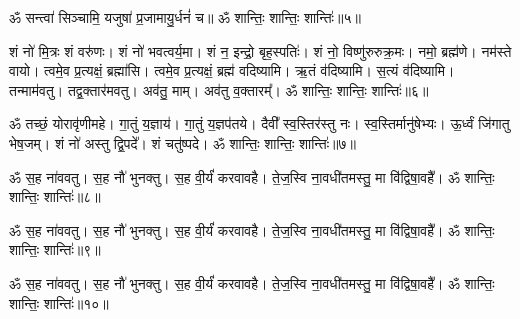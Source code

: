 ॐ सन्त्वा॑ सिञ्चामि॒ यजुषा॑ प्र॒जामायु॒र्धनं॑ च॥ ॐ शान्तिः॒ शान्तिः॒ शान्तिः॑॥५॥


शं नो॑ मि॒त्रः  शं वरु॑णः। शं नो॑ भवत्वर्य॒मा। शं न॒ इन्द्रो॒ बृह॒स्पतिः॑। शं नो॒ विष्णु॑रुरुक्र॒मः। नमो॒ ब्रह्म॑णे। नम॑स्ते वायो। त्वमे॒व प्र॒त्यक्षं॒ ब्रह्मा॑सि। त्वमे॒व प्र॒त्यक्षं॒ ब्रह्म॑ वदिष्यामि। ऋ॒तं व॑दिष्यामि। स॒त्यं व॑दिष्यामि। तन्माम॑वतु। तद्व॒क्तार॑मवतु। अव॑तु॒ माम्। अव॑तु व॒क्तारम्᳚। ॐ शान्तिः॒ शान्तिः॒ शान्तिः॑॥६॥

ॐ तच्छं॒ योरावृ॑णीमहे। गा॒तुं य॒ज्ञाय॑। गा॒तुं य॒ज्ञप॑तये। 
दैवी᳚ स्व॒स्तिर॑स्तु नः। स्व॒स्तिर्मानु॑षेभ्यः। ऊ॒र्ध्वं जि॑गातु भेष॒जम्। 
शं नो॑ अस्तु द्वि॒पदे᳚। शं चतु॑ष्पदे। ॐ शान्तिः॒ शान्तिः॒ शान्तिः॑॥७॥

ॐ स॒ह ना॑ववतु। स॒ह नौ॑ भुनक्तु। स॒ह वी॒र्यं॑ करवावहै। ते॒ज॒स्वि ना॒वधी॑तमस्तु॒ मा वि॑द्विषा॒वहै᳚। ॐ शान्तिः॒ शान्तिः॒ शान्तिः॑॥८॥

ॐ स॒ह ना॑ववतु। स॒ह नौ॑ भुनक्तु। स॒ह वी॒र्यं॑ करवावहै। ते॒ज॒स्वि ना॒वधी॑तमस्तु॒ मा वि॑द्विषा॒वहै᳚। ॐ शान्तिः॒ शान्तिः॒ शान्तिः॑॥९॥

ॐ स॒ह ना॑ववतु। स॒ह नौ॑ भुनक्तु। स॒ह वी॒र्यं॑ करवावहै। ते॒ज॒स्वि ना॒वधी॑तमस्तु॒ मा वि॑द्विषा॒वहै᳚। ॐ शान्तिः॒ शान्तिः॒ शान्तिः॑॥१०॥
